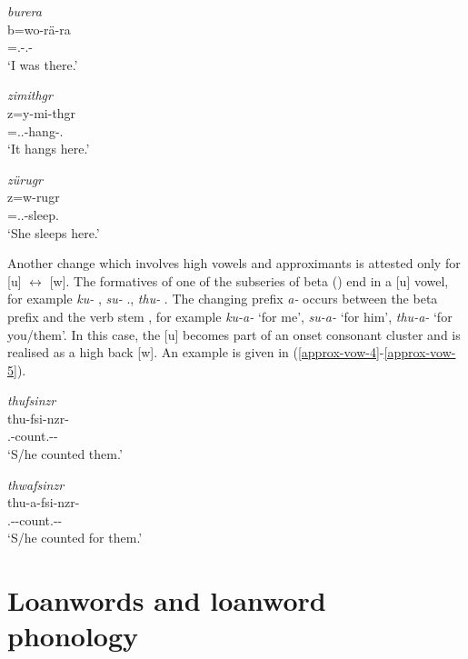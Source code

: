 \begin{exe}
	\ex \emph{burera}\\
	\gll b=wo-rä-ra\\
	\Med{}=\Fsg.\Alph-\Cop.\Ndu{}-\Pst{}\\
	\trans `I was there.'
	\label{approx-vow-2}
	
	\ex \emph{zimithgr}\\
	\gll z=y-mi-thgr\\
	\Prox{}=\Tsg.\Masc.\Alph-hang-\Stat.\Ndu{}\\
	\trans `It hangs here.'
	\label{approx-vow-3}

	\ex \emph{zürugr}\\
	\gll z=w-rugr\\
	\Prox{}=\Tsg.\F.\Alph-sleep.\Ndu{}\\
	\trans `She sleeps here.'
	\label{approx-vow-1}
\end{exe}

Another change which involves high vowels and approximants is attested only for [u] $\leftrightarrow$ [w]. The formatives of one of the subseries of beta (\Betatwo) end in a [u] vowel, for example \emph{ku-} \Fsg{}, \emph{su-} \Tsg.\Masc{}, \emph{thu-} \Stnsg{}. The  changing prefix \emph{a-} occurs between the beta prefix and the verb stem , for example \emph{ku-a-} `for me', \emph{su-a-} `for him', \emph{thu-a-} `for you/them'. In this case, the [u] becomes part of an onset consonant cluster and is realised as a high back  [w]. An example is given in (\ref{approx-vow-4}-\ref{approx-vow-5}).

\begin{exe}
	\ex \emph{thufsinzr}\\
	\gll thu-fsi-nzr-\Zero{}\\
	\Stnsg{}.\Betatwo{}-count.\Ext{}-\Ndu{}-\Stsg{}\\
	\trans `S/he counted them.'
	\label{approx-vow-4}

	\ex \emph{thwafsinzr}\\
	\gll thu-a-fsi-nzr-\Zero{}\\
	\Stnsg{}.\Betatwo{}-\Vc{}-count.\Ext{}-\Ndu{}-\Stsg{}\\
	\trans `S/he counted for them.'
	\label{approx-vow-5}
\end{exe}

\section{Loanwords and loanword phonology} \label{loanword-phonology}

